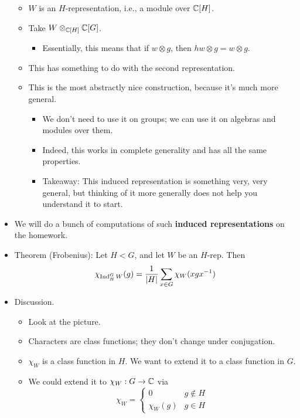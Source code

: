 \documentclass[../notes.tex]{subfiles}
\begin{document}
\begin{itemize}
\begin{itemize}
        \item $W$ is an $H$-representation, i.e., a module over $\mathbb{C}[H]$.
        \item Take $W\otimes_{\mathbb{C}[H]}\mathbb{C}[G]$.
        \begin{itemize}
            \item Essentially, this means that if $w\otimes g$, then $hw\otimes g=w\otimes g$.
        \end{itemize}
        \item This has something to do with the second representation.
        \item This is the most abstractly nice construction, because it's much more general.
        \begin{itemize}
            \item We don't need to use it on groups; we can use it on algebras and modules over them.
            \item Indeed, this works in complete generality and has all the same properties.
            \item Takeaway: This induced representation is something very, very general, but thinking of it more generally does not help you understand it to start.
        \end{itemize}
    \end{itemize}
    \item We will do a bunch of computations of such \textbf{induced representations} on the homework.
    \item Theorem (Frobenius): Let $H<G$, and let $W$ be an $H$-rep. Then
    \begin{equation*}
        \chi_{\operatorname{Ind}_H^GW}(g) = \frac{1}{|H|}\sum_{x\in G}\chi_W(xgx^{-1})
    \end{equation*}
    \item Discussion.
    \begin{itemize}
        \item Look at the picture.
        \item Characters are class functions; they don't change under conjugation.
        \item $\chi_W$ is a class function in $H$. We want to extend it to a class function in $G$.
        \item We could extend it to $\chi_W:G\to\mathbb{C}$ via
        \begin{equation*}
            \chi_W =
            \begin{cases}
                0 & g\notin H\\
                \chi_W(g) & g\in H

\end{cases}
\end{equation*}
\end{itemize}
\end{itemize}
\end{document}
